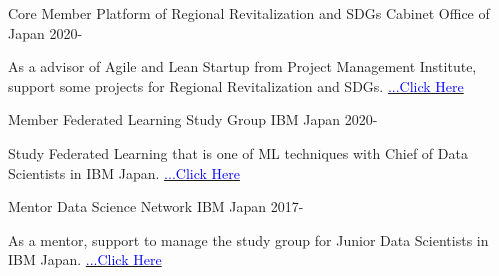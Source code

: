 

\begin{cventries}

  \cventry
    {Core Member} %
    {Platform of Regional Revitalization and SDGs} %
    {Cabinet Office of Japan} %
    {2020-} %
    {
      \begin{cvitems} %
        \item {As a advisor of Agile and Lean Startup from Project Management Institute, support some projects for Regional Revitalization and SDGs. \href{http://future-city.jp/platform/}{\textcolor{blue}{...Click Here}}}
      \end{cvitems}
    }

\cventry
    {Member} %
    {Federated Learning Study Group} %
    {IBM Japan} %
    {2020-} %
    {
      \begin{cvitems} %
        \item {Study Federated Learning that is one of ML techniques with Chief of Data Scientists in IBM Japan. \href{https://www.ibm.com/think/jp-ja/business/csuite_insurtech_case}{\textcolor{blue}{...Click Here}}}
      \end{cvitems}
    }


\cventry
    {Mentor} %
    {Data Science Network} %
    {IBM Japan} %
    {2017-} %
    {
      \begin{cvitems} %
        \item {As a mentor, support to manage the study group for Junior Data Scientists in IBM Japan. \href{https://www.ibm.com/blogs/solutions/jp-ja/datascience_and_ai_dsn/}{\textcolor{blue}{...Click Here}}}
      \end{cvitems}
    }

  
\end{cventries}
